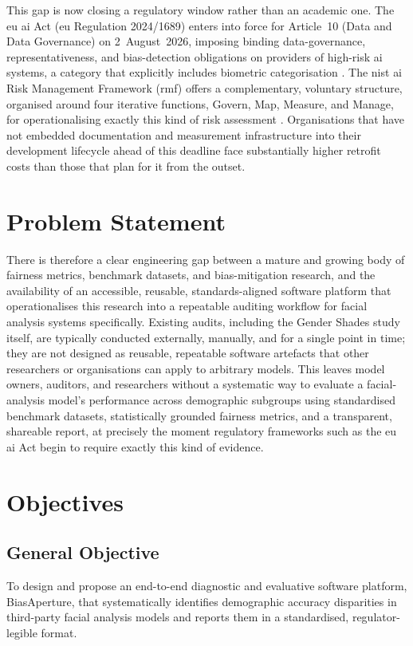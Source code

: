 This gap is now closing a regulatory window rather than an academic one. The \gls{eu} \gls{ai} Act (\gls{eu} Regulation 2024/1689) enters into force for Article~10 (Data and Data Governance) on 2~August~2026, imposing binding data-governance, representativeness, and bias-detection obligations on providers of high-risk \gls{ai} systems, a category that explicitly includes biometric categorisation \cite{euaiact2024}. The \gls{nist} \gls{ai} Risk Management Framework (\gls{rmf}) offers a complementary, voluntary structure, organised around four iterative functions, Govern, Map, Measure, and Manage, for operationalising exactly this kind of risk assessment \cite{nist2023aiframework}. Organisations that have not embedded documentation and measurement infrastructure into their development lifecycle ahead of this deadline face substantially higher retrofit costs than those that plan for it from the outset.

\section{Problem Statement}

There is therefore a clear engineering gap between a mature and growing body of fairness metrics, benchmark datasets, and bias-mitigation research, and the availability of an accessible, reusable, standards-aligned software platform that operationalises this research into a repeatable auditing workflow for facial analysis systems specifically. Existing audits, including the Gender Shades study itself, are typically conducted externally, manually, and for a single point in time; they are not designed as reusable, repeatable software artefacts that other researchers or organisations can apply to arbitrary models. This leaves model owners, auditors, and researchers without a systematic way to evaluate a facial-analysis model's performance across demographic subgroups using standardised benchmark datasets, statistically grounded fairness metrics, and a transparent, shareable report, at precisely the moment regulatory frameworks such as the \gls{eu} \gls{ai} Act begin to require exactly this kind of evidence.

\section{Objectives}

\subsection{General Objective}
To design and propose an end-to-end diagnostic and evaluative software platform, BiasAperture, that systematically identifies demographic accuracy disparities in third-party facial analysis models and reports them in a standardised, regulator-legible format.

